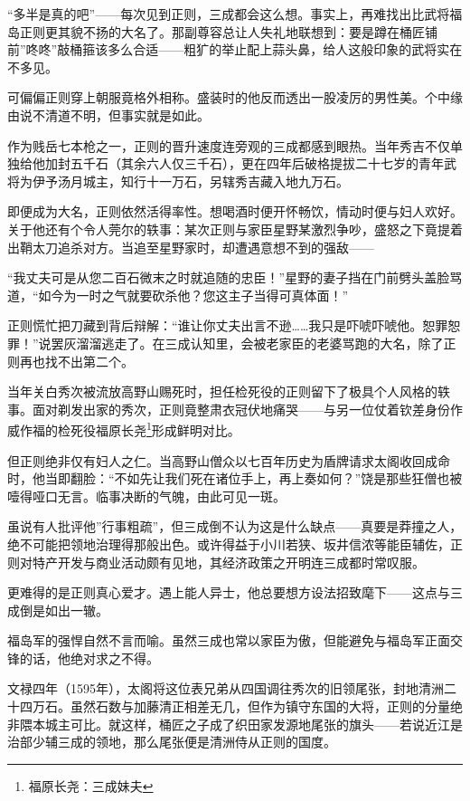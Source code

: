 \documentclass[
]{article}
\begin{document}
``多半是真的吧''------每次见到正则，三成都会这么想。事实上，再难找出比武将福岛正则更其貌不扬的大名了。那副尊容总让人失礼地联想到：要是蹲在桶匠铺前''咚咚''敲桶箍该多么合适------粗犷的举止配上蒜头鼻，给人这般印象的武将实在不多见。

可偏偏正则穿上朝服竟格外相称。盛装时的他反而透出一股凌厉的男性美。个中缘由说不清道不明，但事实就是如此。

作为贱岳七本枪之一，正则的晋升速度连旁观的三成都感到眼热。当年秀吉不仅单独给他加封五千石（其余六人仅三千石），更在四年后破格提拔二十七岁的青年武将为伊予汤月城主，知行十一万石，另辖秀吉藏入地九万石。

即便成为大名，正则依然活得率性。想喝酒时便开怀畅饮，情动时便与妇人欢好。关于他还有个令人莞尔的轶事：某次正则与家臣星野某激烈争吵，盛怒之下竟提着出鞘太刀追杀对方。当追至星野家时，却遭遇意想不到的强敌------

``我丈夫可是从您二百石微末之时就追随的忠臣！''星野的妻子挡在门前劈头盖脸骂道，``如今为一时之气就要砍杀他？您这主子当得可真体面！''

正则慌忙把刀藏到背后辩解：``谁让你丈夫出言不逊\ldots\ldots 我只是吓唬吓唬他。恕罪恕罪！''说罢灰溜溜逃走了。在三成认知里，会被老家臣的老婆骂跑的大名，除了正则再也找不出第二个。

当年关白秀次被流放高野山赐死时，担任检死役的正则留下了极具个人风格的轶事。面对剃发出家的秀次，正则竟整肃衣冠伏地痛哭------与另一位仗着钦差身份作威作福的检死役福原长尧\footnote{福原长尧：三成妹夫}形成鲜明对比。

但正则绝非仅有妇人之仁。当高野山僧众以七百年历史为盾牌请求太阁收回成命时，他当即翻脸：``不如先让我们死在诸位手上，再上奏如何？''饶是那些狂僧也被噎得哑口无言。临事决断的气魄，由此可见一斑。

虽说有人批评他''行事粗疏''，但三成倒不认为这是什么缺点------真要是莽撞之人，绝不可能把领地治理得那般出色。或许得益于小川若狭、坂井信浓等能臣辅佐，正则对特产开发与商业活动颇有见地，其经济政策之开明连三成都时常叹服。

更难得的是正则真心爱才。遇上能人异士，他总要想方设法招致麾下------这点与三成倒是如出一辙。

福岛军的强悍自然不言而喻。虽然三成也常以家臣为傲，但能避免与福岛军正面交锋的话，他绝对求之不得。

文禄四年（1595年），太阁将这位表兄弟从四国调往秀次的旧领尾张，封地清洲二十四万石。虽然石数与加藤清正相差无几，但作为镇守东国的大将，正则的分量绝非隈本城主可比。就这样，桶匠之子成了织田家发源地尾张的旗头------若说近江是治部少辅三成的领地，那么尾张便是清洲侍从正则的国度。
\end{document}
